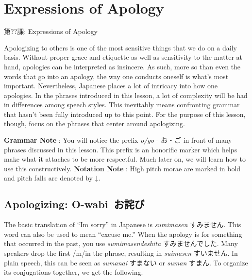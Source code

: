    
\chapter*{Expressions of Apology}

\begin{center}
\begin{Large}
第??課: Expressions of Apology 
\end{Large}
\end{center}
 \hfill\break
 Apologizing to others is one of the most sensitive things that we do on a daily basis. Without proper grace and etiquette as well as sensitivity to the matter at hand, apologies can be interpreted as insincere. As such, more so than even the words that go into an apology, the way one conducts oneself is what's most important. Nevertheless, Japanese places a lot of intricacy into how one apologies.   In the phrases introduced in this lesson, a lot of complexity will be had in differences among speech styles. This inevitably means confronting grammar that hasn't been fully introduced up to this point. For the purpose of this lesson, though, focus on the phrases that center around apologizing. 
\par{\textbf{Grammar Note }: You will notice the prefix \emph{o\slash go }- お・ご in front of many phrases discussed in this lesson. This prefix is an honorific marker which helps make what it attaches to be more respectful. Much later on, we will learn how to use this constructively. }
 \textbf{Notation Note }: High pitch morae are marked in bold and pitch falls are denoted by ↓.        
\section{Apologizing: O-wabi お詫び}
 
\par{ The basic translation of “I\textquotesingle m sorry” in Japanese is \emph{sumimasen }すみません. This word can also be used to mean “excuse me.” When the apology is for something that occurred in the past, you use \emph{sumimasendeshita }すみませんでした. Many speakers drop the first \slash m\slash  in the phrase, resulting in \emph{suimasen }すいません. In plain speech, this can be seen as \emph{sumanai }すまない or \emph{suman }すまん. To organize its conjugations together, we get the following. }

